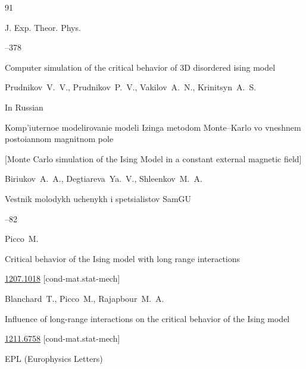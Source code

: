 \begin{thebibliography}{91}

\jour J. Exp. Theor. Phys.




--378

\paper Computer simulation of the critical behavior of 3D disordered ising model

\by Prudnikov~V.~V., Prudnikov~P.~V., Vakilov~A.~N.,  Krinitsyn~A.~S.





\lang In Russian 

\paper  Komp'iuternoe modelirovanie modeli Izinga metodom Monte--Karlo vo vneshnem postoiannom magnitnom pole

\rm [Monte Carlo simulation of the Ising Model  in a constant external magnetic field]

\by Biriukov~A.~A., Degtiareva~Ya.~V., Shleenkov~M.~A.

\jour Vestnik molodykh uchenykh i spetsialistov SamGU



--82






\by Picco~M.

\preprint Critical behavior of the Ising model with long range interactions

\arxiv \href{http://arxiv.org/abs/1207.1018}{1207.1018} [cond-mat.stat-mech]






\by Blanchard~T., Picco~M., Rajapbour~M.~A.

\paper  Influence of long-range interactions on the critical behavior of the Ising model

\arxiv \href{http://arxiv.org/abs/1211.6758}{1211.6758} [cond-mat.stat-mech]


\jour EPL (Europhysics Letters) 



\end{thebibliography}
